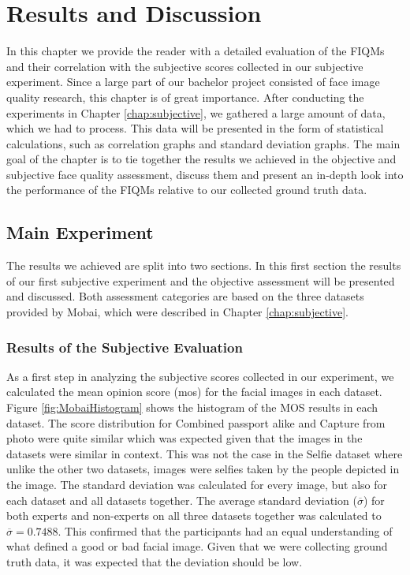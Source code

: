 \chapter{Results and Discussion}
\label{chap:Results}
In this chapter we provide the reader with a detailed evaluation of the FIQMs and their correlation with the subjective scores collected in our subjective experiment. Since a large part of our bachelor project consisted of face image quality research, this chapter is of great importance. After conducting the experiments in Chapter \ref{chap:subjective}, we gathered a large amount of data, which we had to process. This data will be presented in the form of statistical calculations, such as correlation graphs and standard deviation graphs. The main goal of the chapter is to tie together the results we achieved in the objective and subjective face quality assessment, discuss them and present an in-depth look into the performance of the FIQMs relative to our collected ground truth data.   

\section{Main Experiment}
The results we achieved are split into two sections. In this first section the results of our first subjective experiment and the objective assessment will be presented and discussed. Both assessment categories are based on the three datasets provided by Mobai, which were described in Chapter \ref{chap:subjective}. 


\subsection{Results of the Subjective Evaluation}
\label{sec:SubAssessment}

As a first step in analyzing the subjective scores collected in our experiment, we calculated the mean opinion score (\acrshort{mos}) for the facial images in each dataset. Figure \ref{fig:MobaiHistogram} shows the histogram of the MOS results in each dataset. The score distribution for Combined passport alike and Capture from photo were quite similar which was expected given that the images in the datasets were similar in context. This was not the case in the Selfie dataset where unlike the other two datasets, images were selfies taken by the people depicted in the image. The standard deviation was calculated for every image, but also for each dataset and all datasets together. The average standard deviation ($\overline{\sigma}$) for both experts and non-experts on all three datasets together was calculated to $\overline{\sigma} = 0.7488$. This confirmed that the participants had an equal understanding of what defined a good or bad facial image. Given that we were collecting ground truth data, it was expected that the deviation should be low.   

